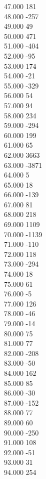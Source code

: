 { 47.000	181 \\
 48.000	-257 \\
 49.000	49 \\
 50.000	471 \\
 51.000	-404 \\
 52.000	-95 \\
 53.000	174 \\
 54.000	-21 \\
 55.000	-329 \\
 56.000	54 \\
 57.000	94 \\
 58.000	234 \\
 59.000	-294 \\
 60.000	199 \\
 61.000	65 \\
 62.000	3663 \\
 63.000	-3871 \\
 64.000	5 \\
 65.000	18 \\
 66.000	-139 \\
 67.000	81 \\
 68.000	218 \\
 69.000	1109 \\
 70.000	-1139 \\
 71.000	-110 \\
 72.000	118 \\
 73.000	-294 \\
 74.000	18 \\
 75.000	61 \\
 76.000	-5 \\
 77.000	126 \\
 78.000	-46 \\
 79.000	-14 \\
 80.000	75 \\
 81.000	77 \\
 82.000	-208 \\
 83.000	-50 \\
 84.000	162 \\
 85.000	85 \\
 86.000	-30 \\
 87.000	-152 \\
 88.000	77 \\
 89.000	60 \\
 90.000	-250 \\
 91.000	108 \\
 92.000	-51 \\
 93.000	31 \\
 94.000	254 \\
}
